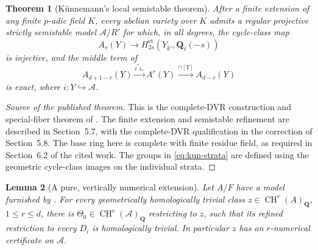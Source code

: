 \documentclass[11pt]{article}
\newtheorem{theorem}{Theorem}[section]
\newtheorem{lemma}[theorem]{Lemma}
\theoremstyle{definition}
\theoremstyle{remark}
\numberwithin{equation}{section}
\newcommand{\CH}{\operatorname{CH}}
\begin{document}
\begin{theorem}[K\"unnemann's local semistable theorem]
\label{thm:kunnemann-local}
After a finite extension of any finite $p$-adic field $K$, every
abelian variety over $K$ admits a regular projective strictly
semistable model $\mathcal A/R'$ for which, in all degrees, the
cycle-class map
\[
 A_s(Y)\longrightarrow
 H^{\mathrm{\acute et}}_{2s}(Y_{\bar k'},\mathbf Q_\ell(-s))
\]
is injective, and the middle term of
\begin{equation}\label{eq:kun-complex}
 A_{d+1-r}(Y)\xrightarrow{i^*i_*} A^r(Y)
                   \xrightarrow{\cap[Y]} A_{d-r}(Y)
\end{equation}
is exact, where $i:Y\hookrightarrow\mathcal A$.
\end{theorem}

\begin{proof}[Source of the published theorem]
This is the complete-DVR construction and special-fiber theorem
of \cite[Theorems~5.6 and~6.6]{Kunnemann}.
The finite extension and semistable refinement are described in
Section~5.7, with the complete-DVR qualification in the correction
of Section~5.8. The base ring here is complete with finite residue
field, as required in Section~6.2 of the cited work. The groups in
\eqref{eq:kun-strata} are defined using the geometric
cycle-class images on the individual strata.
\end{proof}

\begin{lemma}[A pure, vertically numerical extension]
\label{lem:abelian-lift}
Let $A/F$ have a model furnished by
.  For every geometrically homologically
trivial class $z\in\CH^r(A)_{\mathbf Q}$,
$1\le r\le d$, there is $\Theta_0\in\CH^r(\mathcal A)_{\mathbf Q}$
restricting to $z$, such that its refined restriction to
every $D_i$ is homologically trivial.  In particular $z$ has
an $r$-numerical certificate on $\mathcal A$.
\end{lemma}
\end{document}
